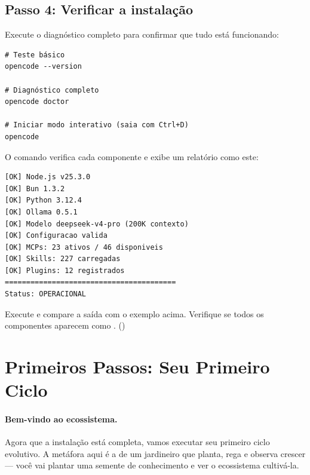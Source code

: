 \subsection{Passo 4: Verificar a instalação}
\label{subsec:passo4}

Execute o diagnóstico completo para confirmar que tudo está funcionando:

\begin{lstlisting}[style=bashstyle, caption={Verificação da instalação},
label={lst:verify}]
# Teste básico
opencode --version

# Diagnóstico completo
opencode doctor

# Iniciar modo interativo (saia com Ctrl+D)
opencode
\end{lstlisting}

O comando  verifica cada componente e exibe um
relatório como este:

\begin{lstlisting}[style=bashstyle, caption={Saída esperada de
\codigo{opencode doctor}}]
[OK] Node.js v25.3.0
[OK] Bun 1.3.2
[OK] Python 3.12.4
[OK] Ollama 0.5.1
[OK] Modelo deepseek-v4-pro (200K contexto)
[OK] Configuracao valida
[OK] MCPs: 23 ativos / 46 disponiveis
[OK] Skills: 227 carregadas
[OK] Plugins: 12 registrados
========================================
Status: OPERACIONAL
\end{lstlisting}

\begin{exercicio}
Execute  e compare a saída com o exemplo
acima. Verifique se todos os componentes aparecem como
\codigo{[OK]}. (\nivelzero)
\end{exercicio}

\section{Primeiros Passos: Seu Primeiro Ciclo}
\label{sec:primeiros-passos}
\nivelzero

\paragraph{Bem-vindo ao ecossistema.} Agora que a instalação está
completa, vamos executar seu primeiro ciclo evolutivo. A metáfora aqui é a
de um jardineiro que planta, rega e observa crescer --- você vai plantar
uma semente de conhecimento e ver o ecossistema cultivá-la.

